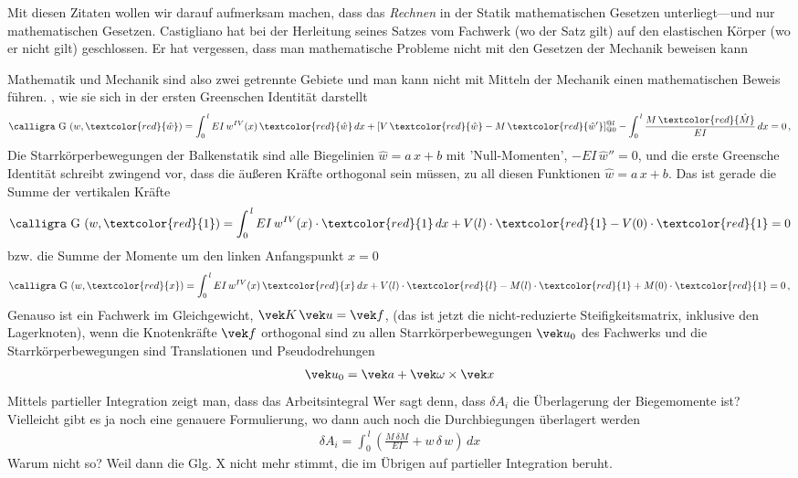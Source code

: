 {Mit diesen Zitaten wollen wir darauf aufmerksam machen, dass das {\em Rechnen\/} in der Statik mathematischen Gesetzen unterliegt---und nur mathematischen Gesetzen. Castigliano hat bei der Herleitung seines Satzes vom Fachwerk (wo der Satz gilt) auf den elastischen K\"{o}rper (wo er nicht gilt) geschlossen. Er hat vergessen, dass man mathematische Probleme nicht mit den Gesetzen der Mechanik beweisen kann

Mathematik und Mechanik sind also zwei getrennte Gebiete und man kann nicht mit Mitteln der Mechanik einen mathematischen Beweis f\"{u}hren.
, wie sie sich in der ersten Greenschen Identit\"{a}t darstellt
\begin{align}
\text{\normalfont\calligra G\,\,}(w,\textcolor{red}{\hat{w}}) = \int_0^{\,l} EI\,w^{IV}(x)\,\textcolor{red}{\hat{w}}\,dx + [V\,\textcolor{red}{\hat{w}} - M\,\textcolor{red}{\hat{w}'}]_{@0}^{@l} - \int_0^{\,l} \frac{M\,\textcolor{red}{\hat{M}}}{EI}\,dx = 0\,,
\end{align}
Die Starrk\"{o}rperbewegungen der Balkenstatik sind alle Biegelinien $\hat{w} = a\,x + b$ mit 'Null-Momenten', $- EI\,\hat{w}'' = 0$, und die erste Greensche Identit\"{a}t schreibt zwingend vor, dass die \"{a}u{\ss}eren Kr\"{a}fte orthogonal sein m\"{u}ssen, zu all diesen Funktionen $\hat{w} = a\,x + b$. Das ist gerade die Summe der vertikalen Kr\"{a}fte
\begin{align}
\text{\normalfont\calligra G\,\,}(w,\textcolor{red}{1}) = \int_0^{\,l}  EI\,w^{IV}(x)\cdot\textcolor{red}{1}\,dx + V(l) \cdot\textcolor{red}{1} - V(0)\cdot\textcolor{red}{1} = 0
\end{align}
bzw. die Summe der Momente um den linken Anfangspunkt $x = 0$
\begin{align}
\text{\normalfont\calligra G\,\,}(w,\textcolor{red}{x}) = \int_0^{\,l} EI\,w^{IV}(x)\,\textcolor{red}{x}\,dx + V(l) \cdot\textcolor{red}{l} - M(l) \cdot\textcolor{red}{1} + M(0) \cdot\textcolor{red}{1}= 0\,,
\end{align}
Genauso ist ein Fachwerk im Gleichgewicht, $\vek K\,\vek u = \vek f$, (das ist jetzt die nicht-reduzierte Steifigkeitsmatrix, inklusive den Lagerknoten), wenn die Knotenkr\"{a}fte $\vek f$ orthogonal sind zu allen Starrk\"{o}rperbewegungen $\vek u_0$ des Fachwerks und die Starrk\"{o}rperbewegungen sind Translationen und Pseudodrehungen
\begin{align}
\vek u_0 = \vek a + \vek \omega \times \vek x
\end{align}
Mittels partieller Integration zeigt man, dass das Arbeitsintegral
Wer sagt denn, dass $\delta A_i$ die \"{U}berlagerung der Biegemomente ist? Vielleicht gibt es ja noch eine genauere Formulierung, wo dann auch noch die Durchbiegungen \"{u}berlagert werden
\begin{align}
\delta A_i = \int_0^{\,l} (\frac{M\,\delta M}{EI} + w\,\delta\,w)\,dx
\end{align}
Warum nicht so? Weil dann die Glg. X nicht mehr stimmt, die im \"{U}brigen auf partieller Integration beruht.

}
